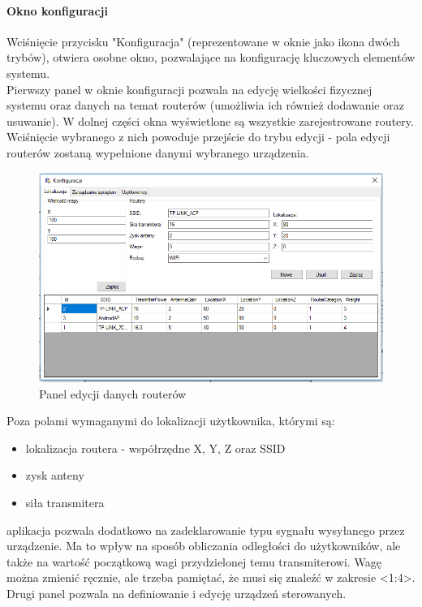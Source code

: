 \documentclass{article}
\begin{document}
		\paragraph{Okno konfiguracji}
		Wciśnięcie przycisku "Konfiguracja" (reprezentowane w oknie jako ikona dwóch trybów), otwiera osobne okno, pozwalające na konfigurację kluczowych elementów systemu.\\
		Pierwszy panel w oknie konfiguracji pozwala na edycję wielkości fizycznej systemu oraz danych na temat routerów (umożliwia ich również dodawanie oraz usuwanie).
		W dolnej części okna wyświetlone są wszystkie zarejestrowane routery. Wciśnięcie wybranego z nich powoduje przejście do trybu edycji - pola edycji routerów zostaną wypełnione danymi wybranego urządzenia.
		\begin{figure}[H]			
			\centering
			\caption{Panel edycji danych routerów}
			\includegraphics[width=1.0\textwidth]{panel_konf_router}
		\end{figure}
		Poza polami wymaganymi do lokalizacji użytkownika, którymi są:
		\begin{itemize}
			\item lokalizacja routera - współrzędne X, Y, Z oraz SSID
			\item zysk anteny
			\item siła transmitera
		\end{itemize}
		aplikacja pozwala dodatkowo na zadeklarowanie typu sygnału wysyłanego przez urządzenie. Ma to wpływ na sposób obliczania odległości do użytkowników, ale także na wartość początkową wagi przydzielonej temu transmiterowi. Wagę można zmienić ręcznie, ale trzeba pamiętać, że musi się znaleźć w zakresie <1:4>.\\
		Drugi panel pozwala na definiowanie i edycję urządzeń sterowanych.
\end{document}
